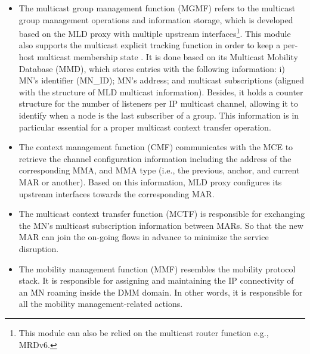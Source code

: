 \begin{itemize}
\item The multicast group management function (MGMF) refers to the multicast group management operations and information storage, which is developed based on the MLD proxy with multiple upstream interfaces\footnote{This module can also be relied on the multicast router function e.g., MRDv6.}. This module also supports the multicast explicit tracking function in order to keep a per-host multicast membership state \cite{explicit_tracking}. It is done based on its Multicast Mobility Database (MMD), which stores entries with the following information: i) MN's identifier (MN\_ID); MN's address; and multicast subscriptions (aligned with the structure of MLD multicast information). Besides, it holds a counter structure for the number of listeners per IP multicast channel, allowing it to identify when a node is the last subscriber of a group. This information is in particular essential for a proper multicast context transfer operation.
\item The context management function (CMF) communicates with the MCE to retrieve the channel configuration information including the address of the corresponding MMA, and MMA type (i.e., the previous, anchor, and current MAR or another). Based on this information, MLD proxy configures its upstream interfaces towards the corresponding MAR. 
\item The multicast context transfer function (MCTF) is responsible for exchanging the MN's multicast subscription information between MARs. So that the new MAR can join the on-going flows in advance to minimize the service disruption. 
\item The mobility management function (MMF) resembles the mobility protocol stack. It is responsible for assigning and maintaining the IP connectivity of an MN roaming inside the DMM domain. In other words, it is responsible for all the mobility management-related actions.  
\end{itemize}
